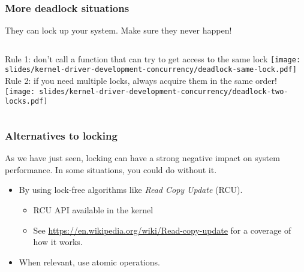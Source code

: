 \begin{frame}
  \frametitle{More deadlock situations} They can lock up your system. Make sure they never happen!
  \vspace{0.5cm}
  \begin{columns}
      Rule 1: don't call a function that can try to get access to the same lock
      \texttt{[image: slides/kernel-driver-development-concurrency/deadlock-same-lock.pdf]}
      Rule 2: if you need multiple locks, always acquire them in the same order!
      \texttt{[image: slides/kernel-driver-development-concurrency/deadlock-two-locks.pdf]}
  \end{columns}
\end{frame}



\begin{frame}
  \frametitle{Alternatives to locking}
  As we have just seen, locking can have a strong negative
  impact on system performance. In some situations, you could do
  without it.
  \begin{itemize}
  \item By using lock-free algorithms like \emph{Read Copy Update}
    (RCU).
    \begin{itemize}
    \item RCU API available in the kernel
    \item See \url{https://en.wikipedia.org/wiki/Read-copy-update} for a
      coverage of how it works.
    \end{itemize}
  \item When relevant, use atomic operations.
  \end{itemize}
\end{frame}

